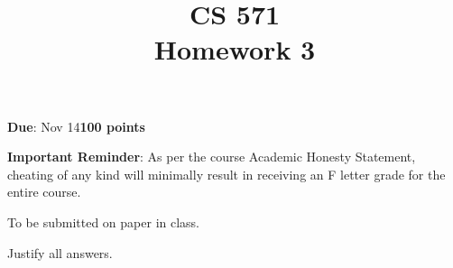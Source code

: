 \documentclass[12pt]{article}
\title{CS 571\\Homework 3}
\date{}
\begin{document}
\maketitle

\begin{flushleft}
\textbf{Due}: Nov 14\hfill\textbf{100 points}\\


\vspace{0.5cm}

\textbf{Important Reminder}: As per the course Academic Honesty
Statement, cheating of any kind will minimally result in receiving an
F letter grade for the entire course.

\vspace{0.5cm}
To be submitted on paper in class.

Justify all answers.
\end{flushleft}
\end{document}
